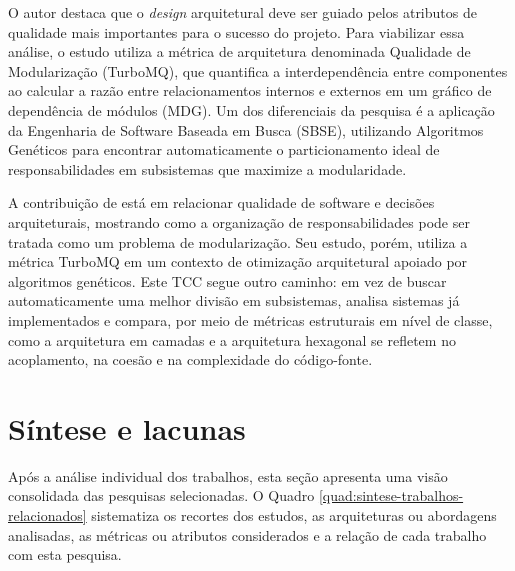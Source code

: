 O autor destaca que o \textit{design} arquitetural deve ser guiado pelos atributos de qualidade mais importantes para o sucesso do projeto. 
Para viabilizar essa análise, o estudo utiliza a métrica de arquitetura denominada Qualidade de Modularização (TurboMQ), que quantifica
a interdependência entre componentes ao calcular a razão entre relacionamentos internos e externos em um gráfico de dependência de módulos 
(MDG). Um dos diferenciais da pesquisa é a aplicação da Engenharia de Software Baseada em Busca (SBSE), utilizando Algoritmos Genéticos para 
encontrar automaticamente o particionamento ideal de responsabilidades em subsistemas que maximize a modularidade.

A contribuição de  está em relacionar qualidade de software e decisões arquiteturais, mostrando como a 
organização de responsabilidades pode ser tratada como um problema de modularização. Seu estudo, porém, utiliza a métrica 
TurboMQ em um contexto de otimização arquitetural apoiado por algoritmos genéticos. Este TCC segue outro caminho: em vez de buscar 
automaticamente uma melhor divisão em subsistemas, analisa sistemas já implementados e compara, por meio de métricas estruturais 
em nível de classe, como a arquitetura em camadas e a arquitetura hexagonal se refletem no acoplamento, na coesão e na complexidade 
do código-fonte.

\section{Síntese e lacunas}
\label{sec:sintese-e-lacunas}

Após a análise individual dos trabalhos, esta seção apresenta uma visão consolidada das pesquisas selecionadas. 
O Quadro \ref{quad:sintese-trabalhos-relacionados} sistematiza os recortes dos estudos, as arquiteturas ou abordagens 
analisadas, as métricas ou atributos considerados e a relação de cada trabalho com esta pesquisa.

